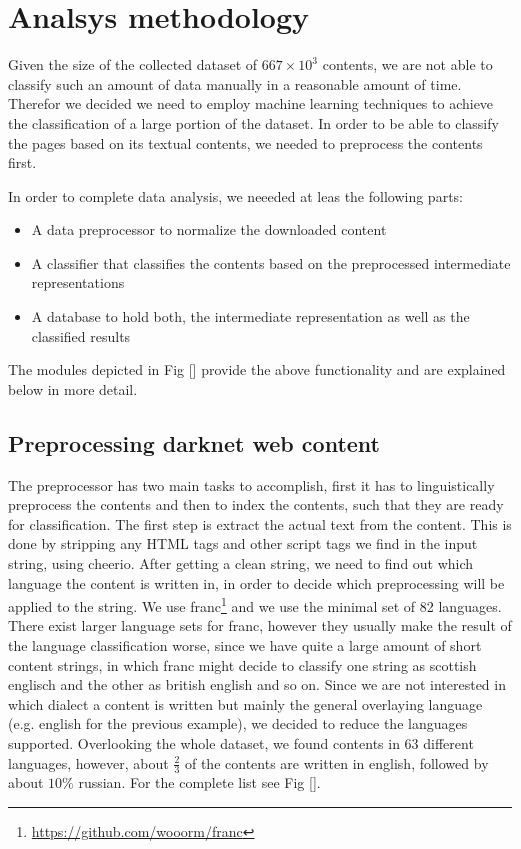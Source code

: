 \documentclass[USenglish,oneside,twocolumn]{article}
\begin{document}
\section{Analsys methodology}
Given the size of the collected dataset of $667\times10^{3}$ contents, we are not able to classify such an amount of data manually in a reasonable amount of time. Therefor we decided we need to employ machine learning techniques to achieve the classification of a large portion of the dataset. In order to be able to classify the pages based on its textual contents, we needed to preprocess the contents first.

In order to complete data analysis, we neeeded at leas the following parts:
\begin{itemize}
    \item A data preprocessor to normalize the downloaded content
    \item A classifier that classifies the contents based on the preprocessed intermediate representations
    \item A database to hold both, the intermediate representation as well as the classified results
\end{itemize}

The modules depicted in Fig [] provide the above functionality and are explained below in more detail.

\subsection{Preprocessing darknet web content}
The preprocessor has two main tasks to accomplish, first it has to linguistically preprocess the contents and then to index the contents, such that they are ready for classification. 
The first step is  extract the actual text from the content. This is done by stripping any HTML tags and other script tags we find in the input string, using cheerio. After getting a clean string, we need to find out which language the content is written in, in order to decide which preprocessing will be applied to the string. We use franc\footnote{\href{https://github.com/wooorm/franc}{https://github.com/wooorm/franc}} and we use the minimal set of 82 languages. There exist larger language sets for franc, however they usually make the result of the language classification worse, since we have quite a large amount of short content strings, in which franc might decide to classify one string as scottish englisch and the other as british english and so on. Since we are not interested in which dialect a content is written but mainly the general overlaying language (e.g. english for the previous example), we decided to reduce the languages supported. Overlooking the whole dataset, we found contents in 63 different languages, however, about $\frac{2}{3}$ of the contents are written in english, followed by about $10\%$ russian. For the complete list see Fig [].
\end{document}
